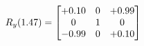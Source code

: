 \documentclass[preview]{standalone}
\begin{document}
\begin{align*}
\special{dvisvgm:raw <g id='unique000'>}R_{y}(1.47) = \begin{bmatrix}+0.10 & 0 & +0.99 \\0 & 1 & 0 \\-0.99 & 0 & +0.10\end{bmatrix}\special{dvisvgm:raw </g>}
\end{align*}
\end{document}
